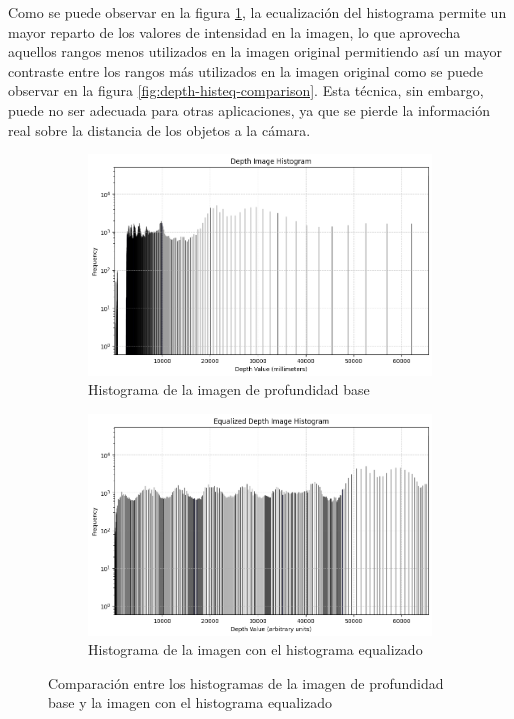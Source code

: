 \documentclass[12pt,a4paper]{report}
\begin{document}
Como se puede observar en la figura \ref{fig:histogram-comparison}, la ecualización del histograma permite un mayor reparto de los valores de intensidad en la imagen, lo que aprovecha aquellos rangos menos utilizados en la imagen original permitiendo así un mayor contraste entre los rangos más utilizados en la imagen original como se puede observar en la figura \ref{fig:depth-histeq-comparison}.
Esta técnica, sin embargo, puede no ser adecuada para otras aplicaciones, ya que se pierde la información real sobre la distancia de los objetos a la cámara.
\begin{figure}[!h]
    \centering
    \begin{subfigure}{0.45\textwidth}
        \centering
        \includegraphics[width=\textwidth]{media/data/normal_histogram.png}
        \caption{Histograma de la imagen de profundidad base}
    \end{subfigure}
    \hfill
    \begin{subfigure}{0.45\textwidth}
        \centering
        \includegraphics[width=\textwidth]{media/data/equalized_histogram.png}
        \caption{Histograma de la imagen con el histograma equalizado}
    \end{subfigure}
    \caption{Comparación entre los histogramas de la imagen de profundidad base y la imagen con el histograma equalizado}
    \label{fig:histogram-comparison}
\end{figure}
\end{document}
